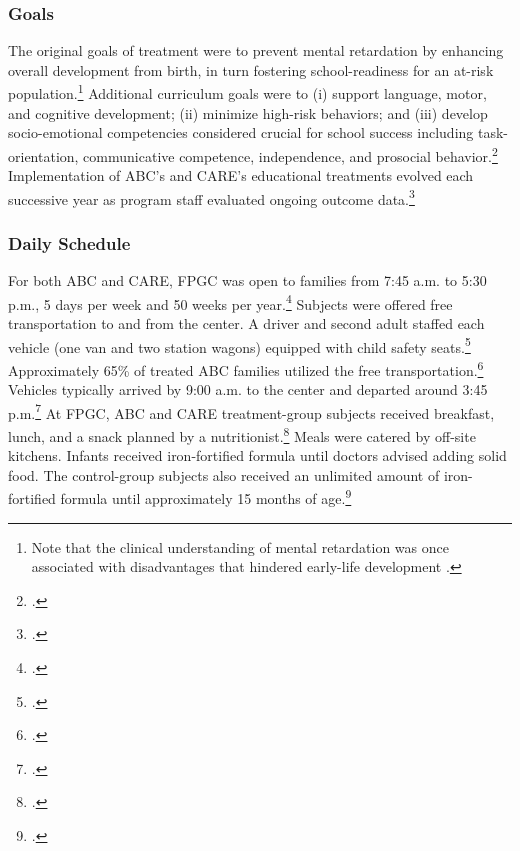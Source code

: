 \subsubsection{Goals}
\noindent The original goals of treatment were to prevent mental retardation by enhancing overall development from birth, in turn fostering school-readiness for an at-risk population.\footnote{Note that the clinical understanding of mental retardation was once associated with disadvantages that hindered early-life development \citep{Mental-Retardation_America_2004_BOOK_NYU}.} Additional curriculum goals were to (i) support language, motor, and cognitive development; (ii) minimize high-risk behaviors; and (iii) develop socio-emotional competencies considered crucial for school success including task-orientation, communicative competence, independence, and prosocial behavior.\footnote{\citet{Ramey_Collier_etal_1976_CarolinaAbecedarianProject, Ramey_etal_1985_Project-CARE_TiECSE, Sparling_1974_Synth_Edu_Infant_SPEECH, Wasik_Ramey_etal_1990_CD, Ramey-etal_2012-ABC}.} Implementation of ABC's and CARE's educational treatments evolved each successive year as program staff evaluated ongoing outcome data.\footnote{ \citet{Ramey-etal_1975_AJoMD, Finkelstein_1982_Day_Care_YC, McGinness_1982_Language-Poverty-Child,Haskins_1985_CD}.}\\


\subsubsection{Daily Schedule}
\noindent For both ABC and CARE, FPGC was open to families from 7:45 a.m. to 5:30 p.m., 5 days per week and 50 weeks per year.\footnote{\citet{Ramey_Collier_etal_1976_CarolinaAbecedarianProject, Ramey_etal_1985_Project-CARE_TiECSE}.} Subjects were offered free transportation to and from the center. A driver and second adult staffed each vehicle (one van and two station wagons) equipped with child safety seats.\footnote{\citet{Ramey_Campbell_1979_SR,abc2014-2015interviews}.} Approximately 65\% of treated ABC families utilized the free transportation.\footnote{\citet{Barnett_Masse_2002_benefitcost}.} Vehicles typically arrived by 9:00 a.m. to the center and departed around 3:45 p.m.\footnote{\citet{Ramey-et-al_1977_Intro-to-ABC}.} At FPGC, ABC and CARE treatment-group subjects received breakfast, lunch, and a snack planned by a nutritionist.\footnote{ \citet{Haskins_1985_CD, Bryant_et_al_1987_Carolina_Approach_TIECSE, Ramey-et-al_1977_Intro-to-ABC}.} Meals were catered by off-site kitchens. Infants received iron-fortified formula  until doctors advised adding solid food. The control-group subjects also received an unlimited amount of iron-fortified formula until approximately 15 months of age.\footnote{\citet{Campbell_Conti_etal_2014_EarlyChildhoodInvestments,abc2014-2015interviews}.}\\

